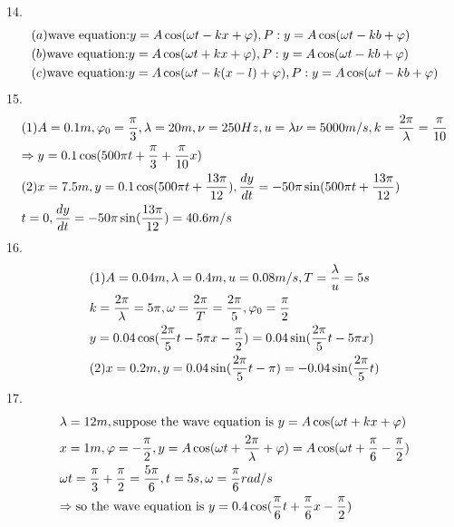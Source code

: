 \documentclass{article}
\begin{document}
14.\[\begin{gathered}
(a){\text{wave equation:}}y = A\cos (\omega t - kx + \varphi ),P:y = A\cos (\omega t - kb + \varphi ) \hfill \\
(b){\text{wave equation:}}y = A\cos (\omega t + kx + \varphi ),P:y = A\cos (\omega t - kb + \varphi ) \hfill \\
(c){\text{wave equation:}}y = A\cos (\omega t - k(x - l) + \varphi ),P:y = A\cos (\omega t - kb + \varphi ) \hfill \\ 
\end{gathered} \]
15.\[\begin{gathered}
(1)A = 0.1m,{\varphi _0} = \frac{\pi }{3},\lambda  = 20m,\nu  = 250Hz,u = \lambda \nu  = 5000m/s,k = \frac{{2\pi }}{\lambda } = \frac{\pi }{{10}} \hfill \\
\Rightarrow y = 0.1\cos (500\pi t + \frac{\pi }{3} + \frac{\pi }{{10}}x) \hfill \\
({\text{2}})x = 7.5m,y = 0.1\cos (500\pi t + \frac{{13\pi }}{{12}}),\frac{{dy}}{{dt}} =  - 50\pi \sin (500\pi t + \frac{{13\pi }}{{12}}) \hfill \\
t = 0,\frac{{dy}}{{dt}} =  - 50\pi \sin (\frac{{13\pi }}{{12}}) = 40.6m/s \hfill \\ 
\end{gathered} \]
16.\[\begin{gathered}
(1)A = 0.04m,\lambda  = 0.4m,u = 0.08m/s,T = \frac{\lambda }{u} = 5s \hfill \\
k = \frac{{2\pi }}{\lambda } = 5\pi ,\omega  = \frac{{2\pi }}{T} = \frac{{2\pi }}{5},{\varphi _0} = \frac{\pi }{2} \hfill \\
y = 0.04\cos (\frac{{2\pi }}{5}t - 5\pi x - \frac{\pi }{2}) = 0.04\sin (\frac{{2\pi }}{5}t - 5\pi x) \hfill \\
(2)x = 0.2m,y = 0.04\sin (\frac{{2\pi }}{5}t - \pi ) =  - 0.04\sin (\frac{{2\pi }}{5}t) \hfill \\ 
\end{gathered} \]
17.\[\begin{gathered}
\lambda  = 12m,{\text{suppose the wave equation is }}y = A\cos (\omega t + kx + \varphi ) \hfill \\
x = 1m,\varphi  =  - \frac{\pi }{2},y = A\cos (\omega t + \frac{{2\pi }}{\lambda } + \varphi ) = A\cos (\omega t + \frac{\pi }{6} - \frac{\pi }{2}) \hfill \\
\omega t = \frac{\pi }{3} + \frac{\pi }{2} = \frac{{5\pi }}{6},t = 5s,\omega  = \frac{\pi }{6}rad/s \hfill \\
\Rightarrow {\text{so the wave equation is }}y = 0.4\cos (\frac{\pi }{6}t + \frac{\pi }{6}x - \frac{\pi }{2}) \hfill \\ 
\end{gathered} \]
\end{document}
